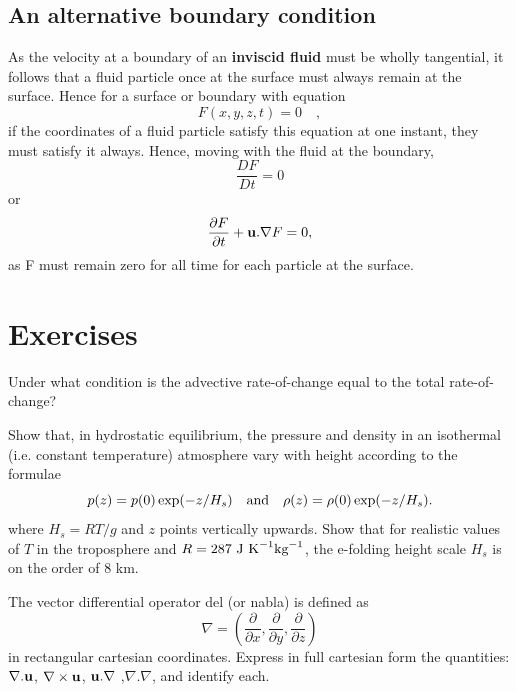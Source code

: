 \documentclass[10pt]{report}
\begin{document}
\subsection{An alternative boundary condition}
As the velocity at a boundary of an \textbf{inviscid fluid} must be wholly
tangential, it follows that a fluid particle once at the surface must always
remain at the surface. Hence for a surface or boundary with equation
\[
F(x,y,z,t)=0\quad ,
\]
if the coordinates of a fluid particle satisfy this equation at one instant,
they must satisfy it always. Hence, moving with the fluid at the boundary,
\[
\frac{DF}{Dt}=0
\]
or
\[ \frac{\partial F}{\partial t}+{{\bf u}}. \nabla
F=0, \]
as F must remain zero for all time for each particle at the surface.

\divider
\pagebreak

\section{Exercises}




\begin{questionstar}
	Under what condition is the advective rate-of-change equal to the total
	rate-of-change?
\label{qn:DDt}
\end{questionstar}

\begin{questionstar}
	Show that, in hydrostatic equilibrium, the pressure and density in an
	isothermal (i.e. constant temperature) atmosphere vary with height
	according to the formulae
	\[ p(z)=p(0)\exp (-z/H_s ) \quad \hbox{and}\quad \rho (z)=\rho
	(0)\exp (-z/H_s ). \]
	 where $H_s ={RT/ g}$ and $z$ points vertically upwards. Show
	that for realistic values of $T$ in the troposphere and
	$R=287 \hbox{ J K}^{-1}\hbox{kg}^{-1}$, the e-folding height
	scale $H_{s}$ is on the order of 8 km.
	\label{qn:lapseheight}
\end{questionstar}

\begin{questionstar}
	The vector differential operator del (or nabla) is defined as
	\[
	\nabla =\left( {\frac{\partial }{\partial x},\frac{\partial }{\partial
	y},\frac{\partial }{\partial z}} \right)
	\]
	in rectangular cartesian coordinates. Express in full cartesian form the
	quantities: $\nabla . {\bf u}$, $\nabla \times {\bf u}$, ${\bf u}. \nabla $
	,$\nabla . \nabla $, and identify each.
	\label{qn:deloperator}
\end{questionstar}
\end{document}
